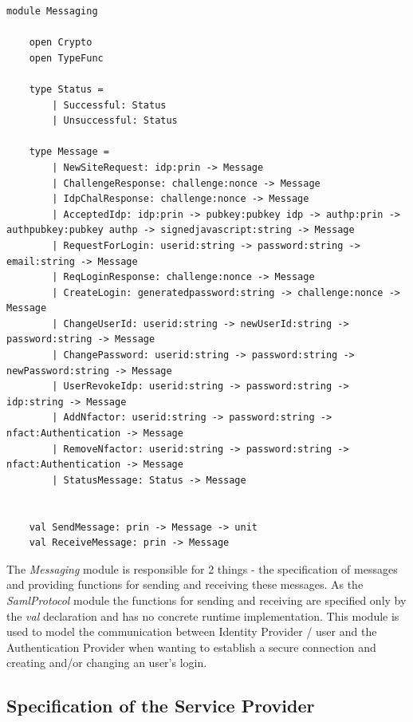 \documentclass[twosided]{report}
\begin{document}
\begin{lstlisting}[style=fstar, caption={Specification of the Messaging protocol}]
	module Messaging
	
	open Crypto
	open TypeFunc

	type Status =
		| Successful: Status
		| Unsuccessful: Status

	type Message =
		| NewSiteRequest: idp:prin -> Message
		| ChallengeResponse: challenge:nonce -> Message
		| IdpChalResponse: challenge:nonce -> Message
		| AcceptedIdp: idp:prin -> pubkey:pubkey idp -> authp:prin -> authpubkey:pubkey authp -> signedjavascript:string -> Message
		| RequestForLogin: userid:string -> password:string -> email:string -> Message
		| ReqLoginResponse: challenge:nonce -> Message
		| CreateLogin: generatedpassword:string -> challenge:nonce -> Message
		| ChangeUserId: userid:string -> newUserId:string -> password:string -> Message
		| ChangePassword: userid:string -> password:string -> newPassword:string -> Message
		| UserRevokeIdp: userid:string -> password:string -> idp:string -> Message
		| AddNfactor: userid:string -> password:string -> nfact:Authentication -> Message
		| RemoveNfactor: userid:string -> password:string -> nfact:Authentication -> Message
		| StatusMessage: Status -> Message


	val SendMessage: prin -> Message -> unit
	val ReceiveMessage: prin -> Message
\end{lstlisting}
The \emph{Messaging} module is responsible for 2 things - the specification of messages and providing functions for sending and receiving these messages. As the \emph{SamlProtocol} module the functions for sending and receiving are specified only by the \emph{val} declaration and has no concrete runtime implementation. This module is used to model the communication between Identity Provider / user and the Authentication Provider when wanting to establish a secure connection and creating and/or changing an user's login.
\subsection{Specification of the Service Provider}
\end{document}
